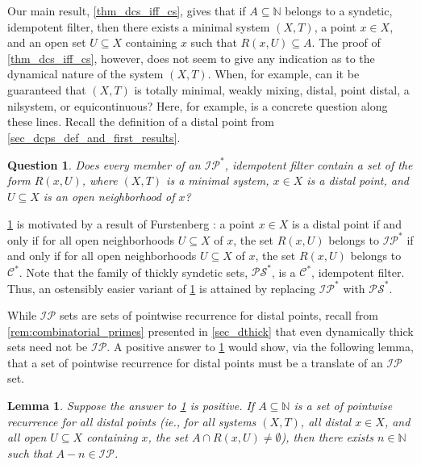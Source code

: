 \documentclass[letter,11pt]{article}
\theoremstyle{plain}
\newtheorem{lemma}[theorem]{Lemma}
\newtheorem{question}[theorem]{Question}
\theoremstyle{definition}
\theoremstyle{plain}
\theoremstyle{plain}
\numberwithin{equation}{section}
\newcommand{\N}{\mathbb{N}}
\newcommand{\PS}{\mathcal{PS}}
\newcommand{\central}{\mathcal{C}}
\newcommand{\IP}{\mathcal{IP}}
\begin{document}
Our main result, \cref{thm_dcs_iff_cs}, gives that if $A \subseteq \N$ belongs to a syndetic, idempotent filter, then there exists a minimal system $(X,T)$, a point $x \in X$, and an open set $U \subseteq X$ containing $x$ such that $R(x,U) \subseteq A$.  The proof of \cref{thm_dcs_iff_cs}, however, does not seem to give any indication as to the dynamical nature of the system $(X,T)$.  When, for example, can it be guaranteed that $(X,T)$ is totally minimal, weakly mixing, distal, point distal, a nilsystem, or equicontinuous?  Here, for example, is a concrete question along these lines.  Recall the definition of a distal point from \cref{sec_dcps_def_and_first_results}.

\begin{question}
\label{question_cstar_idempo_filter_implies_pt_distal}
    Does every member of an $\IP^*$, idempotent filter contain a set of the form $R(x,U)$, where $(X,T)$ is a minimal system, $x \in X$ is a distal point, and $U \subseteq X$ is an open neighborhood of $x$?
\end{question}

\cref{question_cstar_idempo_filter_implies_pt_distal} is motivated by a result of Furstenberg \cite[Thm 9.11]{furstenberg_book_1981}: a point $x \in X$ is a distal point if and only if for all open neighborhoods $U \subseteq X$ of $x$, the set $R(x,U)$ belongs to $\IP^*$ if and only if for all open neighborhoods $U \subseteq X$ of $x$, the set $R(x,U)$ belongs to $\central^*$.  Note that the family of thickly syndetic sets, $\PS^*$, is a $\central^*$, idempotent filter.  Thus, an ostensibly easier variant of \cref{question_cstar_idempo_filter_implies_pt_distal} is attained by replacing $\IP^*$ with $\PS^*$.

While $\IP$ sets are sets of pointwise recurrence for distal points, recall from \cref{rem:combinatorial_primes} presented in \cref{sec_dthick} that even dynamically thick sets need not be $\IP$.  A positive answer to \cref{question_cstar_idempo_filter_implies_pt_distal} would show, via the following lemma, that a set of pointwise recurrence for distal points must be a translate of an $\IP$ set.

\begin{lemma}
    Suppose the answer to \cref{question_cstar_idempo_filter_implies_pt_distal} is positive. If $A \subseteq \N$ is a set of pointwise recurrence for all distal points (ie., for all systems $(X,T)$, all distal $x \in X$, and all open $U \subseteq X$ containing $x$, the set $A \cap R(x,U) \neq \emptyset$), then there exists $n \in \N$ such that $A - n \in \IP$.
\end{lemma}
\end{document}
